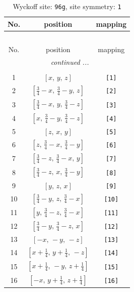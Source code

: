 \documentclass[fleqn,8pt]{jsarticle}
\begin{document}
\begin{longtable}{ccc}
\caption{Wyckoff site: {\tt 96g}, site symmetry: {\tt 1}}
 \\
 \hline \hline
No. & position & mapping \\ \hline \endfirsthead

\multicolumn{2}{l}{\tablename\ \thetable{}} \\
 \hline \hline
No. & position & mapping \\ \hline \endhead

 \hline \hline
\multicolumn{2}{r}{\footnotesize\it continued ...} \\ \endfoot

 \hline \hline
\multicolumn{2}{r}{} \\ \endlastfoot

1 & $\left[ x,\, y,\, z \right]$ & {\tt [1]} \\ \hline
2 & $\left[ \frac{3}{4} - x,\, \frac{3}{4} - y,\, z \right]$ & {\tt [2]} \\ \hline
3 & $\left[ \frac{3}{4} - x,\, y,\, \frac{3}{4} - z \right]$ & {\tt [3]} \\ \hline
4 & $\left[ x,\, \frac{3}{4} - y,\, \frac{3}{4} - z \right]$ & {\tt [4]} \\ \hline
5 & $\left[ z,\, x,\, y \right]$ & {\tt [5]} \\ \hline
6 & $\left[ z,\, \frac{3}{4} - x,\, \frac{3}{4} - y \right]$ & {\tt [6]} \\ \hline
7 & $\left[ \frac{3}{4} - z,\, \frac{3}{4} - x,\, y \right]$ & {\tt [7]} \\ \hline
8 & $\left[ \frac{3}{4} - z,\, x,\, \frac{3}{4} - y \right]$ & {\tt [8]} \\ \hline
9 & $\left[ y,\, z,\, x \right]$ & {\tt [9]} \\ \hline
10 & $\left[ \frac{3}{4} - y,\, z,\, \frac{3}{4} - x \right]$ & {\tt [10]} \\ \hline
11 & $\left[ y,\, \frac{3}{4} - z,\, \frac{3}{4} - x \right]$ & {\tt [11]} \\ \hline
12 & $\left[ \frac{3}{4} - y,\, \frac{3}{4} - z,\, x \right]$ & {\tt [12]} \\ \hline
13 & $\left[ - x,\, - y,\, - z \right]$ & {\tt [13]} \\ \hline
14 & $\left[ x + \frac{1}{4},\, y + \frac{1}{4},\, - z \right]$ & {\tt [14]} \\ \hline
15 & $\left[ x + \frac{1}{4},\, - y,\, z + \frac{1}{4} \right]$ & {\tt [15]} \\ \hline
16 & $\left[ - x,\, y + \frac{1}{4},\, z + \frac{1}{4} \right]$ & {\tt [16]} \\ \hline

\end{longtable}
\end{document}
